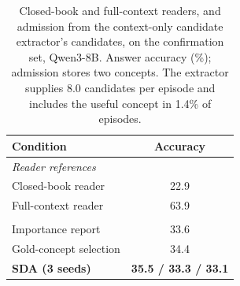 \begin{table}[tbp]
\centering
\caption{Closed-book and full-context readers, and admission from the context-only candidate extractor's candidates, on the confirmation set,
Qwen3-8B. Answer accuracy (\%); admission stores two concepts. The extractor supplies 8.0 candidates per episode
and includes the useful concept in 1.4\% of episodes.}
\label{tab:readerproposal}
\small
\setlength{\tabcolsep}{8pt}
\begin{tabular}{lc}
\toprule
Condition & Accuracy \\
\midrule
\multicolumn{2}{l}{\emph{Reader references}} \\
Closed-book reader & 22.9 \\
Full-context reader & 63.9 \\
\addlinespace
\multicolumn{2}{l}{\emph{Admission from extracted candidates}} \\
Importance report & 33.6 \\
Gold-concept selection & 34.4 \\
\textbf{SDA (3 seeds)} & \textbf{35.5 / 33.3 / 33.1} \\
\bottomrule
\end{tabular}
\end{table}
